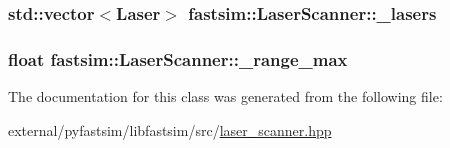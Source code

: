 \subsubsection[{\texorpdfstring{\+\_\+lasers}{_lasers}}]{\setlength{\rightskip}{0pt plus 5cm}std\+::vector$<${\bf Laser}$>$ fastsim\+::\+Laser\+Scanner\+::\+\_\+lasers\hspace{0.3cm}{\ttfamily [protected]}}\hypertarget{classfastsim_1_1_laser_scanner_a65190499a2053eb7eba1cbddeb9812c0}{}\label{classfastsim_1_1_laser_scanner_a65190499a2053eb7eba1cbddeb9812c0}
\subsubsection[{\texorpdfstring{\+\_\+range\+\_\+max}{_range_max}}]{\setlength{\rightskip}{0pt plus 5cm}float fastsim\+::\+Laser\+Scanner\+::\+\_\+range\+\_\+max\hspace{0.3cm}{\ttfamily [protected]}}\hypertarget{classfastsim_1_1_laser_scanner_a2e9ecf8dc0c50814c6916130aaa9956f}{}\label{classfastsim_1_1_laser_scanner_a2e9ecf8dc0c50814c6916130aaa9956f}


The documentation for this class was generated from the following file\+:\begin{DoxyCompactItemize}
\item 
external/pyfastsim/libfastsim/src/\hyperlink{laser__scanner_8hpp}{laser\+\_\+scanner.\+hpp}\end{DoxyCompactItemize}
